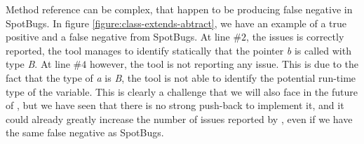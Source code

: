 Method reference can be complex, that happen to be producing false negative in SpotBugs. 
In figure \ref{figure:class-extends-abtract}, we have an example of a true positive and a false negative from SpotBugs. 
At line $\#2$, the issues is correctly reported, the tool manages to identify statically that the pointer \emph{b} is called with type \emph{B}. 
At line $\#4$ however, the tool is not reporting any issue. 
This is due to the fact that the type of \emph{a} is \emph{B}, the tool is not able to identify the potential run-time type of the variable.\newline
This is clearly a challenge that we will also face in the future of \slang{}, but we have seen that there is no strong push-back to implement it, and it could already greatly increase the number of issues reported by \slang{}, even if we have the same false negative as SpotBugs.
